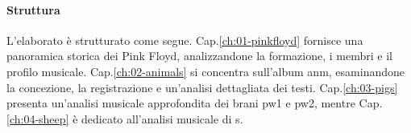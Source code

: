 \documentclass[class=book, crop=false, oneside, 12pt]{standalone}
\begin{document}
\paragraph{Struttura}
L'elaborato è strutturato come segue. Cap.\ref{ch:01-pinkfloyd} fornisce una panoramica storica dei Pink Floyd, analizzandone la formazione, i membri e il profilo musicale. Cap.\ref{ch:02-animals} si concentra sull'album \acrlong{anm}, esaminandone la concezione, la registrazione e un'analisi dettagliata dei testi. Cap.\ref{ch:03-pigs} presenta un'analisi musicale approfondita dei brani \acrlong{pw1} e \acrlong{pw2}, mentre Cap.\ref{ch:04-sheep} è dedicato all'analisi musicale di \acrlong{s}.
\end{document}
